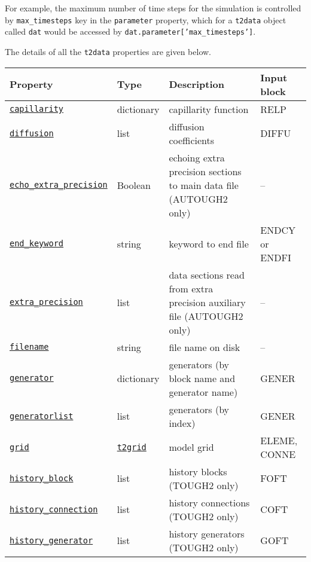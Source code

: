 For example, the maximum number of time steps for the simulation is controlled by \texttt{max\_timesteps} key in the \texttt{parameter} property, which for a \texttt{t2data} object called \texttt{dat} would be accessed by \texttt{dat.parameter['max\_timesteps']}.

The details of all the \texttt{t2data} properties are given below.

\begin{sidewaystable}
  \begin{center}
    \begin{tabular}{|l|l|l|l|}
      \hline
      \textbf{Property} & \textbf{Type} & \textbf{Description} & \textbf{Input block}\\
      \hline
      \hyperref[sec:t2data:capillarity]{\texttt{capillarity}} & dictionary & capillarity function & RELP\\
      \hyperref[sec:t2data:diffusion]{\texttt{diffusion}} & list & diffusion coefficients & DIFFU\\
      \hyperref[sec:t2data:echo_extra_precision]{\texttt{echo\_extra\_precision}} & Boolean & echoing extra precision sections to main data file (AUTOUGH2 only) & --\\
      \hyperref[sec:t2data:end_keyword]{\texttt{end\_keyword}} & string & keyword to end file & ENDCY or ENDFI\\
      \hyperref[sec:t2data:extra_precision]{\texttt{extra\_precision}} & list & data sections read from extra precision auxiliary file (AUTOUGH2 only) & --\\
      \hyperref[sec:t2data:filename]{\texttt{filename}} & string & file name on disk & --\\
      \hyperref[sec:t2data:generator]{\texttt{generator}} & dictionary & generators (by block name and generator name) & GENER\\
      \hyperref[sec:t2data:generatorlist]{\texttt{generatorlist}} & list & generators (by index) & GENER\\
      \hyperref[sec:t2data:grid]{\texttt{grid}} & \hyperref[t2grids]{\texttt{t2grid}} & model grid & ELEME, CONNE\\
      \hyperref[sec:t2data:history_block]{\texttt{history\_block}} & list & history blocks (TOUGH2 only) & FOFT\\
      \hyperref[sec:t2data:history_connection]{\texttt{history\_connection}} & list & history connections (TOUGH2 only) & COFT\\
      \hyperref[sec:t2data:history_generator]{\texttt{history\_generator}} & list & history generators (TOUGH2 only) & GOFT\\

\end{tabular}
\end{center}
\end{sidewaystable}

